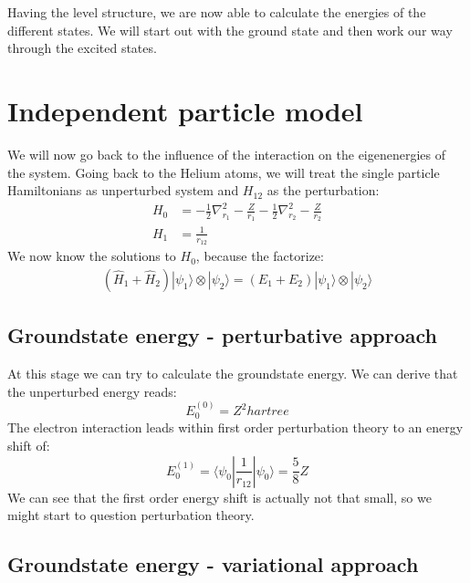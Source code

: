 \documentclass[10pt]{article}
\begin{document}
Having the level structure, we are now able to calculate the energies of the different states. We will start out with the ground state and then work our way through the excited states. 


\section{Independent particle model}

We will now go back to the influence of the interaction on the eigenenergies of the system. Going back to the Helium atoms, we will treat the single particle Hamiltonians as unperturbed system and $H_{12}$ as the perturbation:
\begin{align}
H_0 &= -\frac{1}{2}\nabla_{r_1}^2 -\frac{Z}{r_1} -\frac{1}{2}\nabla_{r_2}^2 -\frac{Z}{r_2}\\
H_1 &=\frac{1}{r_{12}}
\end{align}
We now know the solutions to $H_0$, because the factorize:
\begin{align}
\left(\hat{H}_1 + \hat{H}_2\right)|\psi_1\rangle\otimes|\psi_2\rangle = 
\left(E_1 + E_2\right)|\psi_1\rangle\otimes|\psi_2\rangle
\end{align}
\subsection{Groundstate energy - perturbative approach}
At this stage we can try to calculate the groundstate energy. We can derive that the unperturbed energy reads:
\begin{equation}
E_0^{(0)}= Z^2\si{hartree}
\end{equation}
The electron interaction leads within first order perturbation theory to an energy shift of:
\begin{equation}
E_0^{(1)}= \langle\psi_0|\frac{1}{r_{12}}|\psi_0\rangle = \frac{5}{8}Z
\end{equation}
We can see that the first order energy shift is actually not that small, so we might start to question perturbation theory.

\subsection{Groundstate energy - variational approach}
\end{document}
